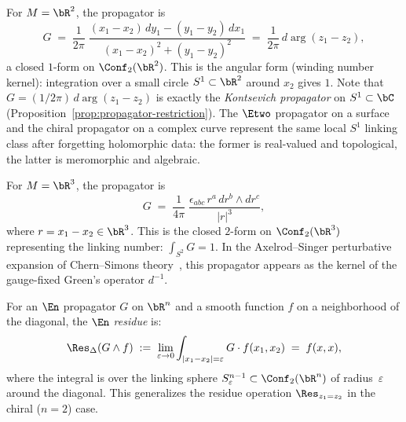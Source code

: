 \begin{example}[\texorpdfstring{$n = 2$}{n = 2}: the \texorpdfstring{$\Etwo$}{E2} propagator on \texorpdfstring{$\bR^2$}{R2}]
\label{ex:n2-propagator}
For $M = \bR^2$, the propagator is
\[
G \;=\;
\frac{1}{2\pi}\;
\frac{(x_1 - x_2)\, dy_1 - (y_1 - y_2)\, dx_1}
 {(x_1 - x_2)^2 + (y_1 - y_2)^2}
\;=\;
\frac{1}{2\pi}\, d\arg(z_1 - z_2),
\]
a closed $1$-form on $\Conf_2(\bR^2)$. This is the angular form
(winding number kernel): integration over a small circle
$S^1 \subset \bR^2$ around $x_2$ gives $1$. Note that
$G = (1/2\pi)\, d\arg(z_1 - z_2)$ is exactly the
\emph{Kontsevich propagator} on $S^1 \subset \bC$
(Proposition~\ref{prop:propagator-restriction}). The $\Etwo$
propagator on a surface and the chiral propagator on a complex curve
represent the same local $S^1$ linking class after forgetting
holomorphic data: the former is real-valued and topological, the
latter is meromorphic and algebraic.
\end{example}

\begin{example}[\texorpdfstring{$n = 3$}{n = 3}: the Chern--Simons propagator]
\label{ex:n3-propagator}
For $M = \bR^3$, the propagator is
\[
G \;=\;
\frac{1}{4\pi}\;
\frac{\epsilon_{abc}\, r^a\, dr^b \wedge dr^c}{|r|^3},
\]
where $r = x_1 - x_2 \in \bR^3$. This is the closed $2$-form on
$\Conf_2(\bR^3)$ representing the linking number:
$\int_{S^2} G = 1$. In the Axelrod--Singer perturbative expansion of
Chern--Simons theory~\cite{Kon94}, this propagator appears as the
kernel of the gauge-fixed Green's operator $d^{-1}$.
\end{example}

\begin{proposition}
\label{prop:linking-sphere-residue}
For an $\En$ propagator $G$ on $\bR^n$ and a smooth function
$f$ on a neighborhood of the diagonal, the \emph{$\En$ residue} is:
\begin{equation}\label{eq:en-residue}
\Res_\Delta(G \wedge f)
\;:=\;
\lim_{\varepsilon \to 0}
\int_{|x_1 - x_2| = \varepsilon} G \cdot f(x_1, x_2)
\;=\; f(x, x),
\end{equation}
where the integral is over the linking sphere
$S^{n-1}_\varepsilon \subset \Conf_2(\bR^n)$ of radius~$\varepsilon$
around the diagonal. This generalizes the residue operation
$\Res_{z_1 = z_2}$ in the chiral ($n = 2$) case.
\end{proposition}

